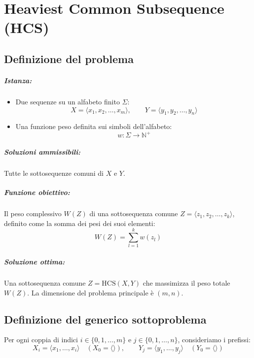 \chapter{Heaviest Common Subsequence (HCS)}

\section{Definizione del problema}

\paragraph{Istanza:}
\begin{itemize}
    \item Due sequenze su un alfabeto finito $\Sigma$:
    \[
        X = \langle x_1, x_2, \dots, x_m \rangle, \qquad Y = \langle y_1, y_2, \dots, y_n \rangle
    \]
    \item Una funzione peso definita sui simboli dell'alfabeto:
    \[
        w : \Sigma \to \mathbb{N}^+
    \]
\end{itemize}

\paragraph{Soluzioni ammissibili:}
Tutte le sottosequenze comuni di $X$ e $Y$.

\paragraph{Funzione obiettivo:}
Il peso complessivo $W(Z)$ di una sottosequenza comune $Z = \langle z_1, z_2, \dots, z_k \rangle$, definito come la somma dei pesi dei suoi elementi:
\[
    W(Z) = \sum_{l=1}^k w(z_l)
\]

\paragraph{Soluzione ottima:}
Una sottosequenza comune $Z = \text{HCS}(X, Y)$ che massimizza il peso totale $W(Z)$. La dimensione del problema principale è $(m, n)$.

\section{Definizione del generico sottoproblema}

Per ogni coppia di indici $i \in \{0, 1, \dots, m\}$ e $j \in \{0, 1, \dots, n\}$, consideriamo i prefissi:
\[
    X_i = \langle x_1, \dots, x_i \rangle \quad (X_0 = \langle \rangle), \qquad Y_j = \langle y_1, \dots, y_j \rangle \quad (Y_0 = \langle \rangle)
\]

